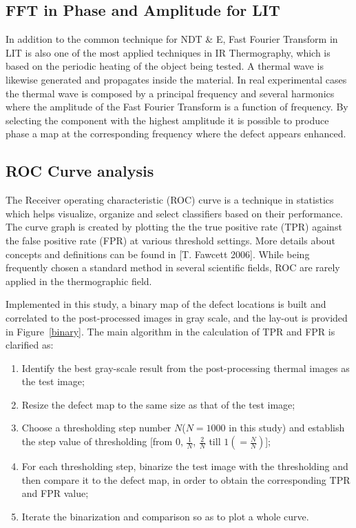 \documentclass[]{spie}  %
\begin{document}
\subsection{FFT in Phase and Amplitude for LIT}
In addition to the common technique for NDT \& E, Fast Fourier Transform in LIT\cite{wu1998lock} is also one of the most applied techniques in IR Thermography, which is based on the periodic heating of the object being tested. A thermal wave is likewise generated and propagates inside the material. In real experimental cases the thermal wave is composed by a principal frequency and several harmonics where the amplitude of the Fast Fourier Transform is a function of frequency. By selecting the component with the highest amplitude it is possible to produce phase a map at the corresponding frequency where the defect appears enhanced.


\subsection{ROC Curve analysis} %
\label{sub:roc_curve_analysis}
The Receiver operating characteristic (ROC) curve is a technique in statistics which helps visualize, organize and select classifiers based on their performance. The curve graph is created by plotting the the true positive rate (TPR) against the false positive rate (FPR) at various threshold settings. More details about concepts and definitions can be found in [T. Fawcett 2006]\cite{Fawcett2006}. While being frequently chosen a standard method in several scientific fields, ROC are rarely applied in the thermographic field.\cite{Bison2014a} 

Implemented in this study, a binary map of the defect locations is built and correlated to the post-processed images in gray scale, and the lay-out is provided in Figure~\ref{binary}. The main algorithm in the calculation of TPR and FPR is clarified as:
\begin{enumerate}
   \item Identify the best gray-scale result from the post-processing thermal images as the test image;
   \item Resize the defect map to the same size as that of the test image;
   \item Choose a thresholding step number $N$($N=1000$ in this study) and establish the step value of thresholding [from $0$, $\frac{1}{N}$, $\frac{2}{N}$ till $1 (=\frac{N}{N})$];
   \item For each thresholding step, binarize the test image with the thresholding and then compare it to the defect map, in order to obtain the corresponding TPR and FPR value;
   \item Iterate the binarization and comparison so as to plot a whole curve.
\end{enumerate}
\end{document}
